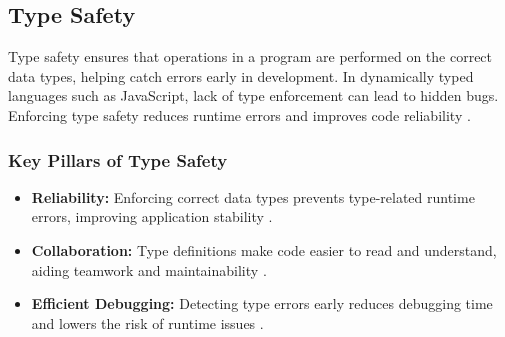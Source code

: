 \subsection{Type Safety}
\label{subsec:type-safety}

Type safety ensures that operations in a program are performed on the correct data types, helping catch errors early in development. In dynamically typed languages such as JavaScript, lack of type enforcement can lead to hidden bugs. Enforcing type safety reduces runtime errors and improves code reliability \cite{dev:type-safety}.

\subsubsection*{Key Pillars of Type Safety}
\label{subsubsec:type-safety-pillars}

\begin{itemize}
\item \textbf{Reliability:} Enforcing correct data types prevents type-related runtime errors, improving application stability \cite{dev:type-safety}.

\item \textbf{Collaboration:} Type definitions make code easier to read and understand, aiding teamwork and maintainability \cite{dev:type-safety}.

\item \textbf{Efficient Debugging:} Detecting type errors early reduces debugging time and lowers the risk of runtime issues \cite{dev:type-safety}.
\end{itemize}
